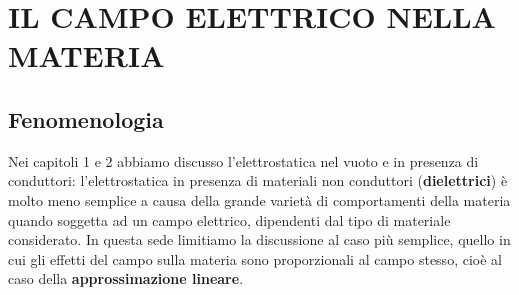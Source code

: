 \section{IL CAMPO ELETTRICO NELLA MATERIA}

\subsection{Fenomenologia}

Nei capitoli 1 e 2 abbiamo discusso l'elettrostatica nel vuoto e in presenza di
conduttori: l'elettrostatica in presenza di materiali non conduttori
(\textbf{dielettrici}) \`e molto meno semplice a causa della grande variet\`a di
comportamenti della materia quando soggetta ad un campo elettrico, dipendenti
dal tipo di materiale considerato. In questa sede limitiamo la discussione al
caso pi\`u semplice, quello in cui gli effetti del campo sulla materia sono
proporzionali al campo stesso, cio\`e al caso della \textbf{approssimazione
lineare}.

